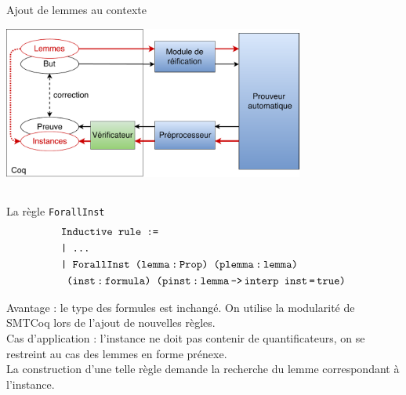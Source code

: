 \documentclass{beamer}
\begin{document}
    \subsection{}
    \begin{frame}{Ajout de lemmes au contexte}
      \begin{center}
        \includegraphics[height=5cm]{ajout_lemmes.pdf}
      \end{center}
    \end{frame}




    \subsection{}
    \begin{frame}{La règle \texttt{ForallInst}}
      \begin{align*}
        &\texttt{Inductive rule :=}\\
        &\texttt{| ... } \\
        &\texttt{| ForallInst }\texttt{(lemma\,:\,Prop) (plemma\,:\,lemma)} \\
        &\texttt{         (inst\,:}\texttt{\,formula) (pinst\,:\,lemma\,->\,interp inst\,=\,true)}
      \end{align*}

      Avantage : le type des formules est inchangé. On utilise la modularité de SMTCoq lors de l'ajout de nouvelles règles.  \\
      \vspace{0.3cm}
      Cas d'application : l'instance ne doit pas contenir de quantificateurs, on se restreint au cas des lemmes en forme prénexe. \\
      \vspace{0.3cm}
      La construction d'une telle règle demande la recherche du lemme correspondant à l'instance.
    \end{frame}
\end{document}
